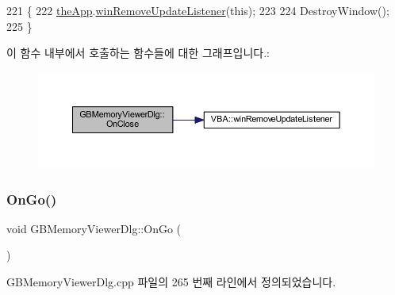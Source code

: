 \begin{DoxyCode}
221 \{
222   \mbox{\hyperlink{_v_b_a_8cpp_a8095a9d06b37a7efe3723f3218ad8fb3}{theApp}}.\mbox{\hyperlink{class_v_b_a_a2d31a0656df2230310aa8dc9e3a735d3}{winRemoveUpdateListener}}(\textcolor{keyword}{this});
223   
224   DestroyWindow();
225 \}
\end{DoxyCode}
이 함수 내부에서 호출하는 함수들에 대한 그래프입니다.\+:
\nopagebreak
\begin{figure}[H]
\begin{center}
\leavevmode
\includegraphics[width=350pt]{class_g_b_memory_viewer_dlg_aff8b13af0ecd94d5ef812dbfcb73728a_cgraph}
\end{center}
\end{figure}
\mbox{\label{class_g_b_memory_viewer_dlg_ade5919e22370d16bb0457a79f81d5877}} 
\subsubsection{\texorpdfstring{On\+Go()}{OnGo()}}
{\footnotesize\ttfamily void G\+B\+Memory\+Viewer\+Dlg\+::\+On\+Go (\begin{DoxyParamCaption}{ }\end{DoxyParamCaption})\hspace{0.3cm}{\ttfamily [protected]}}



G\+B\+Memory\+Viewer\+Dlg.\+cpp 파일의 265 번째 라인에서 정의되었습니다.


